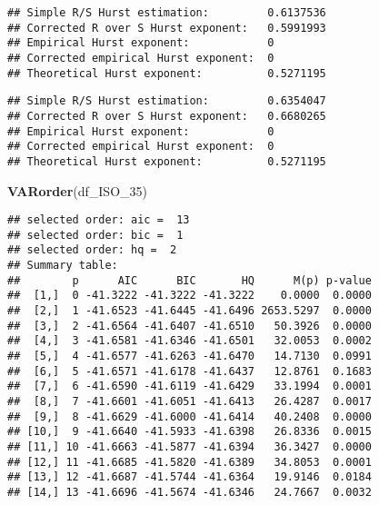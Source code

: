 \documentclass[
]{article}
\newenvironment{Shaded}{\begin{snugshade}}{\end{snugshade}}
\newcommand{\FunctionTok}[1]{\textcolor[rgb]{0.13,0.29,0.53}{\textbf{#1}}}
\newcommand{\NormalTok}[1]{#1}
\newcommand{\SpecialCharTok}[1]{\textcolor[rgb]{0.81,0.36,0.00}{\textbf{#1}}}
\begin{document}
\begin{Shaded}
\end{Shaded}

\begin{verbatim}
## Simple R/S Hurst estimation:         0.6137536 
## Corrected R over S Hurst exponent:   0.5991993 
## Empirical Hurst exponent:            0 
## Corrected empirical Hurst exponent:  0 
## Theoretical Hurst exponent:          0.5271195
\end{verbatim}

\begin{Shaded}
\end{Shaded}

\begin{verbatim}
## Simple R/S Hurst estimation:         0.6354047 
## Corrected R over S Hurst exponent:   0.6680265 
## Empirical Hurst exponent:            0 
## Corrected empirical Hurst exponent:  0 
## Theoretical Hurst exponent:          0.5271195
\end{verbatim}

\begin{Shaded}
\begin{Highlighting}[]
\FunctionTok{VARorder}\NormalTok{(df\_ISO\_35)}
\end{Highlighting}
\end{Shaded}

\begin{verbatim}
## selected order: aic =  13 
## selected order: bic =  1 
## selected order: hq =  2 
## Summary table:  
##        p      AIC      BIC       HQ      M(p) p-value
##  [1,]  0 -41.3222 -41.3222 -41.3222    0.0000  0.0000
##  [2,]  1 -41.6523 -41.6445 -41.6496 2653.5297  0.0000
##  [3,]  2 -41.6564 -41.6407 -41.6510   50.3926  0.0000
##  [4,]  3 -41.6581 -41.6346 -41.6501   32.0053  0.0002
##  [5,]  4 -41.6577 -41.6263 -41.6470   14.7130  0.0991
##  [6,]  5 -41.6571 -41.6178 -41.6437   12.8761  0.1683
##  [7,]  6 -41.6590 -41.6119 -41.6429   33.1994  0.0001
##  [8,]  7 -41.6601 -41.6051 -41.6413   26.4287  0.0017
##  [9,]  8 -41.6629 -41.6000 -41.6414   40.2408  0.0000
## [10,]  9 -41.6640 -41.5933 -41.6398   26.8336  0.0015
## [11,] 10 -41.6663 -41.5877 -41.6394   36.3427  0.0000
## [12,] 11 -41.6685 -41.5820 -41.6389   34.8053  0.0001
## [13,] 12 -41.6687 -41.5744 -41.6364   19.9146  0.0184
## [14,] 13 -41.6696 -41.5674 -41.6346   24.7667  0.0032
\end{verbatim}
\end{document}

